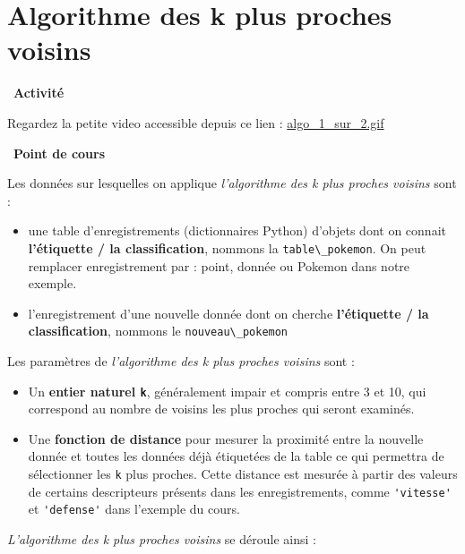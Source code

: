 \documentclass[
  11pt,
]{article}
\newcommand{\passthrough}[1]{#1}
\providecommand{\tightlist}{%
  \setlength{\itemsep}{0pt}\setlength{\parskip}{0pt}}
\newcounter{thme}
\newcounter{activite}
\newenvironment{activite}[1]
{\par \medskip   \noindent   \addtocounter{activite}{1}
\begin{bclogo}[arrondi =0.1,   noborder = true, logo=\bcvelo, marge=4]{~\textbf{Activité} \textbf{\theactivite} {\itshape #1} }  \par}
{
\end{bclogo}
 \par \bigskip }
\newcounter{def}
\newcounter{cours}
\newenvironment{cours}[1]
{\par \medskip   \addtocounter{cours}{1} \noindent  
\begin{bclogo}[arrondi =0.1,  ombre = true, barre=none, logo=\bcbook, marge=4]{~\textbf{Point de cours} \textbf{\thecours} {\itshape #1} }  \par}
{
\end{bclogo}
 \par \bigskip }
\newcounter{alg}
\begin{document}
\hypertarget{algorithme-des-k-plus-proches-voisins}{%
\section{Algorithme des k plus proches
voisins}\label{algorithme-des-k-plus-proches-voisins}}

\begin{activite}{}

Regardez la petite video accessible depuis ce lien :
\url{algo_1_sur_2.gif}

\end{activite}

\begin{cours}{}

Les données sur lesquelles on applique \emph{l'algorithme des k plus
proches voisins} sont :

\begin{itemize}
\tightlist
\item
  une table d'enregistrements (dictionnaires Python) d'objets dont on
  connait \textbf{l'étiquette / la classification}, nommons la
  \passthrough{\lstinline!table\_pokemon!}. On peut remplacer
  enregistrement par : point, donnée ou Pokemon dans notre exemple.
\item
  l'enregistrement d'une nouvelle donnée dont on cherche
  \textbf{l'étiquette / la classification}, nommons le
  \passthrough{\lstinline!nouveau\_pokemon!}
\end{itemize}

Les paramètres de \emph{l'algorithme des k plus proches voisins} sont :

\begin{itemize}
\tightlist
\item
  Un \textbf{entier naturel \passthrough{\lstinline!k!}}, généralement
  impair et compris entre 3 et 10, qui correspond au nombre de voisins
  les plus proches qui seront examinés.
\item
  Une \textbf{fonction de distance} pour mesurer la proximité entre la
  nouvelle donnée et toutes les données déjà étiquetées de la table ce
  qui permettra de sélectionner les \passthrough{\lstinline!k!} plus
  proches. Cette distance est mesurée à partir des valeurs de certains
  descripteurs présents dans les enregistrements, comme
  \passthrough{\lstinline!'vitesse'!} et
  \passthrough{\lstinline!'defense'!} dans l'exemple du cours.
\end{itemize}

\emph{L'algorithme des k plus proches voisins} se déroule ainsi :


\end{cours}
\end{document}
